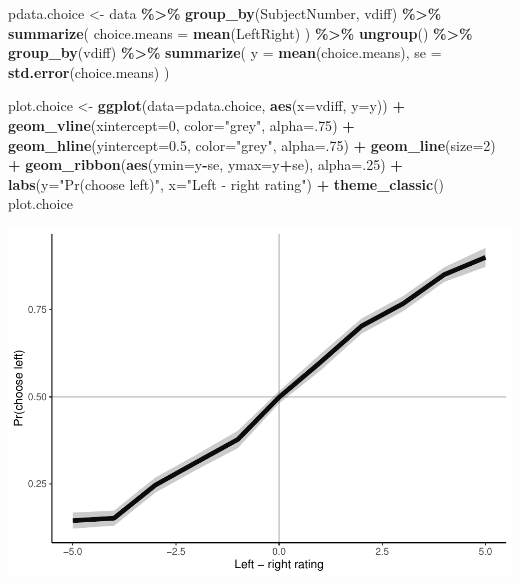 \documentclass[
]{book}
\newenvironment{Shaded}{\begin{snugshade}}{\end{snugshade}}
\newcommand{\AttributeTok}[1]{\textcolor[rgb]{0.13,0.29,0.53}{#1}}
\newcommand{\DecValTok}[1]{\textcolor[rgb]{0.00,0.00,0.81}{#1}}
\newcommand{\FloatTok}[1]{\textcolor[rgb]{0.00,0.00,0.81}{#1}}
\newcommand{\FunctionTok}[1]{\textcolor[rgb]{0.13,0.29,0.53}{\textbf{#1}}}
\newcommand{\NormalTok}[1]{#1}
\newcommand{\OtherTok}[1]{\textcolor[rgb]{0.56,0.35,0.01}{#1}}
\newcommand{\SpecialCharTok}[1]{\textcolor[rgb]{0.81,0.36,0.00}{\textbf{#1}}}
\newcommand{\StringTok}[1]{\textcolor[rgb]{0.31,0.60,0.02}{#1}}
\begin{document}
\begin{Shaded}
\begin{Highlighting}[]
\NormalTok{pdata.choice }\OtherTok{\textless{}{-}}\NormalTok{ data }\SpecialCharTok{\%\textgreater{}\%}
  \FunctionTok{group\_by}\NormalTok{(SubjectNumber, vdiff) }\SpecialCharTok{\%\textgreater{}\%}
  \FunctionTok{summarize}\NormalTok{(}
    \AttributeTok{choice.means =} \FunctionTok{mean}\NormalTok{(LeftRight)}
\NormalTok{  ) }\SpecialCharTok{\%\textgreater{}\%}
  \FunctionTok{ungroup}\NormalTok{() }\SpecialCharTok{\%\textgreater{}\%}
  \FunctionTok{group\_by}\NormalTok{(vdiff) }\SpecialCharTok{\%\textgreater{}\%}
  \FunctionTok{summarize}\NormalTok{(}
    \AttributeTok{y =} \FunctionTok{mean}\NormalTok{(choice.means),}
    \AttributeTok{se =} \FunctionTok{std.error}\NormalTok{(choice.means)}
\NormalTok{  )}

\NormalTok{plot.choice }\OtherTok{\textless{}{-}} \FunctionTok{ggplot}\NormalTok{(}\AttributeTok{data=}\NormalTok{pdata.choice, }\FunctionTok{aes}\NormalTok{(}\AttributeTok{x=}\NormalTok{vdiff, }\AttributeTok{y=}\NormalTok{y)) }\SpecialCharTok{+}
  \FunctionTok{geom\_vline}\NormalTok{(}\AttributeTok{xintercept=}\DecValTok{0}\NormalTok{, }\AttributeTok{color=}\StringTok{"grey"}\NormalTok{, }\AttributeTok{alpha=}\NormalTok{.}\DecValTok{75}\NormalTok{) }\SpecialCharTok{+}
  \FunctionTok{geom\_hline}\NormalTok{(}\AttributeTok{yintercept=}\FloatTok{0.5}\NormalTok{, }\AttributeTok{color=}\StringTok{"grey"}\NormalTok{, }\AttributeTok{alpha=}\NormalTok{.}\DecValTok{75}\NormalTok{) }\SpecialCharTok{+}
  \FunctionTok{geom\_line}\NormalTok{(}\AttributeTok{size=}\DecValTok{2}\NormalTok{) }\SpecialCharTok{+}
  \FunctionTok{geom\_ribbon}\NormalTok{(}\FunctionTok{aes}\NormalTok{(}\AttributeTok{ymin=}\NormalTok{y}\SpecialCharTok{{-}}\NormalTok{se, }\AttributeTok{ymax=}\NormalTok{y}\SpecialCharTok{+}\NormalTok{se), }\AttributeTok{alpha=}\NormalTok{.}\DecValTok{25}\NormalTok{) }\SpecialCharTok{+}
  \FunctionTok{labs}\NormalTok{(}\AttributeTok{y=}\StringTok{"Pr(choose left)"}\NormalTok{, }\AttributeTok{x=}\StringTok{"Left {-} right rating"}\NormalTok{) }\SpecialCharTok{+}
  \FunctionTok{theme\_classic}\NormalTok{()}
\NormalTok{plot.choice}
\end{Highlighting}
\end{Shaded}

\includegraphics{LateNightBayes_files/figure-latex/unnamed-chunk-57-1.pdf}
\end{document}
